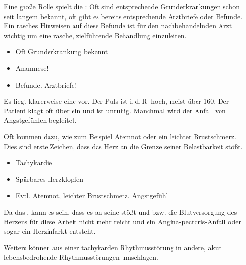 {{Eine große Rolle spielt die : Oft sind
entsprechende Grunderkrankungen schon seit langem bekannt,
oft gibt es bereits entsprechende Arztbriefe oder Befunde.
Ein rasches Hinweisen auf diese Befunde ist für den
nachbehandelnden Arzt wichtig um eine rasche, zielführende
Behandlung einzuleiten.
}{
\begin{itemize}
  \item Oft Grunderkrankung bekannt
  \item Anamnese!
  \item Befunde, Arztbriefe!
\end{itemize}
}{}{}{}

{Es liegt klarerweise eine  vor. Der Puls
ist i.\,d.\,R. hoch, meist über 160\PerMin*. Der Patient
klagt oft über ein  und ist unruhig. Manchmal wird der Anfall von
Angstgefühlen begleitet.

Oft kommen  dazu, wie zum Beispiel Atemnot oder ein leichter
Brustschmerz. Dies sind erste Zeichen, dass das Herz an
die Grenze seiner Belastbarkeit stößt.\bigskip
}{
\begin{itemize}
  \item Tachykardie
  \item Spürbares Herzklopfen
  \item Evtl. Atemnot, leichter Brustschmerz, Angstgefühl
\end{itemize}
}{}{}{}

{%
Da das ,
kann es sein, dass es an seine  stößt und
 bzw. die Blutversorgung des Herzens für diese
Arbeit nicht mehr reicht und ein Angina-pectoris-Anfall oder
sogar ein Herzinfarkt entsteht.

Weiters können aus einer tachykarden Rhythmusstörung in
andere, akut lebensbedrohende Rhythmusstörungen umschlagen.

}}
